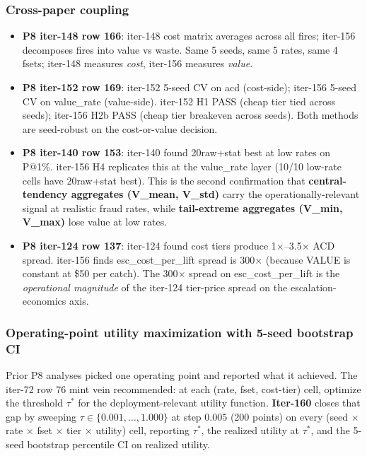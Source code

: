 \documentclass{article}
\begin{document}
\subsubsection{Cross-paper coupling}
\begin{itemize}
  \item \textbf{P8 iter-148 row 166}: iter-148 cost matrix averages
    across all fires; iter-156 decomposes fires into value vs waste.
    Same 5 seeds, same 5 rates, same 4 fsets; iter-148 measures
    \emph{cost}, iter-156 measures \emph{value}.
  \item \textbf{P8 iter-152 row 169}: iter-152 5-seed CV on
    acd (cost-side); iter-156 5-seed CV on value\_rate
    (value-side).  iter-152 H1 PASS (cheap tier tied across seeds);
    iter-156 H2b PASS (cheap tier breakeven across seeds).  Both
    methods are seed-robust on the cost-or-value decision.
  \item \textbf{P8 iter-140 row 153}: iter-140 found 20raw+stat
    best at low rates on P@1\%.  iter-156 H4 replicates this at the
    value\_rate layer (10/10 low-rate cells have 20raw+stat best).
    This is the second confirmation that \textbf{central-tendency
    aggregates (V\_mean, V\_std)} carry the operationally-relevant
    signal at realistic fraud rates, while \textbf{tail-extreme
    aggregates (V\_min, V\_max)} lose value at low rates.
  \item \textbf{P8 iter-124 row 137}: iter-124 found cost tiers
    produce 1$\times$--3.5$\times$ ACD spread.  iter-156 finds
    esc\_cost\_per\_lift spread is 300$\times$ (because VALUE is
    constant at \$50 per catch).  The 300$\times$ spread on
    esc\_cost\_per\_lift is the \emph{operational magnitude} of the
    iter-124 tier-price spread on the escalation-economics axis.
\end{itemize} 

\subsubsection{Operating-point utility maximization with 5-seed bootstrap CI}
\label{sec:p8-iter160}

Prior P8 analyses picked one operating point and reported what it achieved.
The iter-72 row 76 mint vein recommended: at each (rate, fset, cost-tier)
cell, optimize the threshold $\tau^*$ for the deployment-relevant utility
function. \textbf{Iter-160} closes that gap by sweeping $\tau \in
\{0.001,\ldots,1.000\}$ at step $0.005$ (200 points) on every
(seed $\times$ rate $\times$ fset $\times$ tier $\times$ utility) cell,
reporting $\tau^*$, the realized utility at $\tau^*$, and the 5-seed
bootstrap percentile CI on realized utility.
\end{document}
